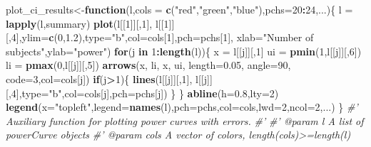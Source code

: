 \documentclass[]{article}
\newenvironment{Shaded}{\begin{snugshade}}{\end{snugshade}}
\newcommand{\KeywordTok}[1]{\textcolor[rgb]{0.13,0.29,0.53}{\textbf{#1}}}
\newcommand{\DataTypeTok}[1]{\textcolor[rgb]{0.13,0.29,0.53}{#1}}
\newcommand{\DecValTok}[1]{\textcolor[rgb]{0.00,0.00,0.81}{#1}}
\newcommand{\FloatTok}[1]{\textcolor[rgb]{0.00,0.00,0.81}{#1}}
\newcommand{\StringTok}[1]{\textcolor[rgb]{0.31,0.60,0.02}{#1}}
\newcommand{\CommentTok}[1]{\textcolor[rgb]{0.56,0.35,0.01}{\textit{#1}}}
\newcommand{\ControlFlowTok}[1]{\textcolor[rgb]{0.13,0.29,0.53}{\textbf{#1}}}
\newcommand{\OperatorTok}[1]{\textcolor[rgb]{0.81,0.36,0.00}{\textbf{#1}}}
\newcommand{\NormalTok}[1]{#1}
\begin{document}
\begin{Shaded}
\begin{Highlighting}[]
\NormalTok{plot_ci_results<-}\ControlFlowTok{function}\NormalTok{(l,}\DataTypeTok{cols =} \KeywordTok{c}\NormalTok{(}\StringTok{"red"}\NormalTok{,}\StringTok{"green"}\NormalTok{,}\StringTok{"blue"}\NormalTok{),}\DataTypeTok{pchs=}\DecValTok{20}\OperatorTok{:}\DecValTok{24}\NormalTok{,...)\{}
\NormalTok{  l =}\StringTok{ }\KeywordTok{lapply}\NormalTok{(l,summary)}
  \KeywordTok{plot}\NormalTok{(l[[}\DecValTok{1}\NormalTok{]][,}\DecValTok{1}\NormalTok{], l[[}\DecValTok{1}\NormalTok{]][,}\DecValTok{4}\NormalTok{],}\DataTypeTok{ylim=}\KeywordTok{c}\NormalTok{(}\DecValTok{0}\NormalTok{,}\FloatTok{1.2}\NormalTok{),}\DataTypeTok{type=}\StringTok{"b"}\NormalTok{,}\DataTypeTok{col=}\NormalTok{cols[}\DecValTok{1}\NormalTok{],}\DataTypeTok{pch=}\NormalTok{pchs[}\DecValTok{1}\NormalTok{],}
       \DataTypeTok{xlab=}\StringTok{"Number of subjects"}\NormalTok{,}\DataTypeTok{ylab=}\StringTok{"power"}\NormalTok{)}
  \ControlFlowTok{for}\NormalTok{(j }\ControlFlowTok{in} \DecValTok{1}\OperatorTok{:}\KeywordTok{length}\NormalTok{(l))\{}
\NormalTok{    x =}\StringTok{ }\NormalTok{l[[j]][,}\DecValTok{1}\NormalTok{]}
\NormalTok{    ui =}\StringTok{ }\KeywordTok{pmin}\NormalTok{(}\DecValTok{1}\NormalTok{,l[[j]][,}\DecValTok{6}\NormalTok{])}
\NormalTok{    li =}\StringTok{ }\KeywordTok{pmax}\NormalTok{(}\DecValTok{0}\NormalTok{,l[[j]][,}\DecValTok{5}\NormalTok{])}
    \KeywordTok{arrows}\NormalTok{(x, li, x, ui, }\DataTypeTok{length=}\FloatTok{0.05}\NormalTok{, }\DataTypeTok{angle=}\DecValTok{90}\NormalTok{, }\DataTypeTok{code=}\DecValTok{3}\NormalTok{,}\DataTypeTok{col=}\NormalTok{cols[j])  }
    \ControlFlowTok{if}\NormalTok{(j}\OperatorTok{>}\DecValTok{1}\NormalTok{)\{}
      \KeywordTok{lines}\NormalTok{(l[[j]][,}\DecValTok{1}\NormalTok{], l[[j]][,}\DecValTok{4}\NormalTok{],}\DataTypeTok{type=}\StringTok{"b"}\NormalTok{,}\DataTypeTok{col=}\NormalTok{cols[j],}\DataTypeTok{pch=}\NormalTok{pchs[j])}
\NormalTok{    \}}
\NormalTok{  \}}
  \KeywordTok{abline}\NormalTok{(}\DataTypeTok{h=}\FloatTok{0.8}\NormalTok{,}\DataTypeTok{lty=}\DecValTok{2}\NormalTok{)}
  \KeywordTok{legend}\NormalTok{(}\DataTypeTok{x=}\StringTok{"topleft"}\NormalTok{,}\DataTypeTok{legend=}\KeywordTok{names}\NormalTok{(l),}\DataTypeTok{pch=}\NormalTok{pchs,}\DataTypeTok{col=}\NormalTok{cols,}\DataTypeTok{lwd=}\DecValTok{2}\NormalTok{,}\DataTypeTok{ncol=}\DecValTok{2}\NormalTok{,...)}
\NormalTok{\}}
\CommentTok{#' Auxiliary function for plotting power curves with errors.}
\CommentTok{#' }
\CommentTok{#'  @param l A list of powerCurve objects}
\CommentTok{#'  @param cols A vector of colors, length(cols)>=length(l)}

\end{Highlighting}
\end{Shaded}
\end{document}
